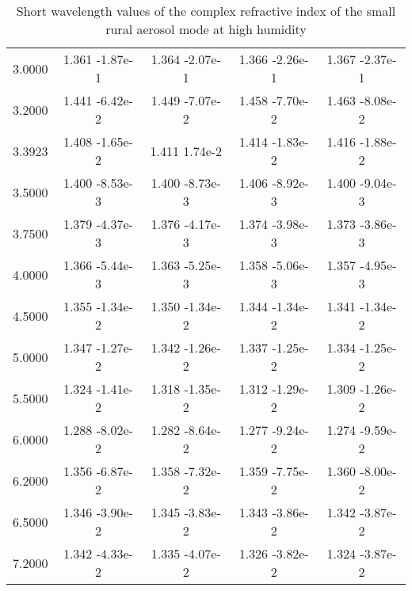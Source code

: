 \documentclass[12pt]{article}
\begin{document}
\begin{center}
\begin{table}
\begin{tabular}{| c | c | c | c | c |  }
3.0000  &    1.361 -1.87e-1  &  1.364 -2.07e-1  &  1.366 -2.26e-1  &  1.367 -2.37e-1 \\
3.2000  &    1.441 -6.42e-2 &   1.449 -7.07e-2  &  1.458 -7.70e-2  &  1.463 -8.08e-2 \\
3.3923  &    1.408 -1.65e-2 &   1.411  1.74e-2  &  1.414 -1.83e-2  &  1.416 -1.88e-2 \\
3.5000   &   1.400 -8.53e-3 &   1.400 -8.73e-3  &  1.406 -8.92e-3 &   1.400 -9.04e-3 \\
3.7500   &   1.379 -4.37e-3 &   1.376 -4.17e-3 &   1.374 -3.98e-3  &  1.373 -3.86e-3 \\
4.0000   &   1.366 -5.44e-3 &   1.363 -5.25e-3  &  1.358 -5.06e-3  &  1.357 -4.95e-3 \\
4.5000  &   1.355 -1.34e-2  &  1.350 -1.34e-2  &  1.344 -1.34e-2  &  1.341 -1.34e-2 \\
5.0000  &   1.347 -1.27e-2 &   1.342 -1.26e-2  &  1.337 -1.25e-2  &  1.334 -1.25e-2 \\
5.5000   &   1.324 -1.41e-2  &  1.318 -1.35e-2 &   1.312 -1.29e-2 &   1.309 -1.26e-2 \\
6.0000   &   1.288 -8.02e-2  &  1.282 -8.64e-2 &   1.277 -9.24e-2  &  1.274 -9.59e-2 \\
6.2000   &   1.356 -6.87e-2  &  1.358 -7.32e-2 &   1.359 -7.75e-2  &  1.360 -8.00e-2 \\
6.5000  &    1.346 -3.90e-2  &  1.345 -3.83e-2  &  1.343 -3.86e-2  &  1.342 -3.87e-2 \\
7.2000  &    1.342 -4.33e-2  &  1.335 -4.07e-2  &  1.326 -3.82e-2  &  1.324 -3.87e-2 \\
\hline
\end{tabular}
\caption{Short wavelength values of the complex refractive index of the small rural aerosol mode at high humidity}
\end{table}
\end{center}
\end{document}
